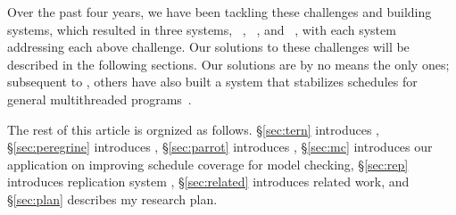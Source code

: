Over the past four years, we have been tackling these challenges and
building \smt systems, which resulted in three \smt systems,
\tern~\cite{cui:tern:osdi10}, \peregrine~\cite{peregrine:sosp11}, and
 \peregrine~\cite{peregrine:sosp11}, with each system addressing each above challenge.
 Our solutions to these challenges will be described in the following sections.
 Our solutions are by no means the only
 ones; subsequent to \tern, others have also built a system that
 stabilizes schedules for general multithreaded programs~\cite{dthreads:sosp11}.

The rest of this article is orgnized as follows. \S\ref{sec:tern} introduces \tern, 
\S\ref{sec:peregrine} introduces 
\peregrine, \S\ref{sec:parrot} introduces \parrot, \S\ref{sec:mc} introduces our 
application on improving schedule coverage for model checking,
\S\ref{sec:rep} introduces replication system \msmr, \S\ref{sec:related} introduces 
related work, and \S\ref{sec:plan} describes my research plan.

